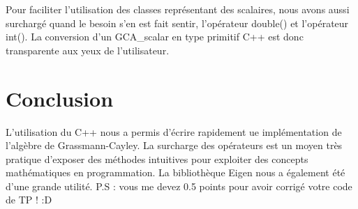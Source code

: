 \documentclass[12pt]{article}
\begin{document}
Pour faciliter l'utilisation des classes représentant des scalaires, nous avons aussi surchargé quand le besoin s'en est fait sentir, l'opérateur double() et l'opérateur int(). La conversion d'un GCA\_scalar en type primitif C++ est donc transparente aux yeux de l'utilisateur. 



\newpage
\section{Conclusion}
L'utilisation du C++ nous a permis d'écrire rapidement ue implémentation de l'algèbre de Grassmann-Cayley. La surcharge des opérateurs est un moyen très pratique d'exposer des méthodes intuitives pour exploiter des concepts mathématiques en programmation.
La bibliothèque Eigen nous a également été d'une grande utilité.
\newline P.S : vous me devez 0.5 points pour avoir corrigé votre code de TP ! :D

\end{document}
